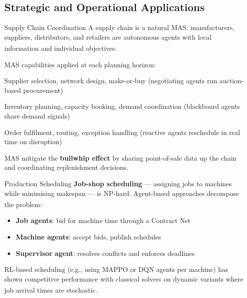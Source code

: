 \subsection{Strategic and Operational Applications}

\begin{v3topic}{Supply Chain Coordination}
    A supply chain is a natural MAS: manufacturers, suppliers, distributors, and
    retailers are autonomous agents with local information and individual
    objectives.\textsuperscript{\cite[][p.~22]{chopraSupplyChainManagement2019}}

    MAS capabilities applied at each planning horizon:
    \begin{description}[leftmargin=0.6cm, labelindent=0pt]
        \item[\textbf{Strategic}] Supplier selection, network design, make-or-buy
              (negotiating agents run auction-based procurement)
        \item[\textbf{Tactical}] Inventory planning, capacity booking, demand
              coordination (blackboard agents share demand signals)
        \item[\textbf{Operational}] Order fulfilment, routing, exception handling
              (reactive agents reschedule in real time on disruption)
    \end{description}
    MAS mitigate the \textbf{bullwhip effect} by sharing point-of-sale data
    up the chain and coordinating replenishment decisions.

\end{v3topic}
\begin{v3topic}{Production Scheduling}
    \textbf{Job-shop scheduling} --- assigning jobs to machines while minimising
    makespan --- is NP-hard. Agent-based approaches decompose the problem:
    \textsuperscript{\cite[][p.~4]{paolucciAgentBasedManufacturing2005}}
    \begin{itemize}
        \item \textbf{Job agents}: bid for machine time through a Contract Net
        \item \textbf{Machine agents}: accept bids, publish schedules
        \item \textbf{Supervisor agent}: resolves conflicts and enforces deadlines
    \end{itemize}
    RL-based scheduling (e.g., using MAPPO or DQN agents per machine) has shown
    competitive performance with classical solvers on dynamic variants where
    job arrival times are
    stochastic.\textsuperscript{\cite{panJobShopSchedulingRL2021}}

\end{v3topic}

